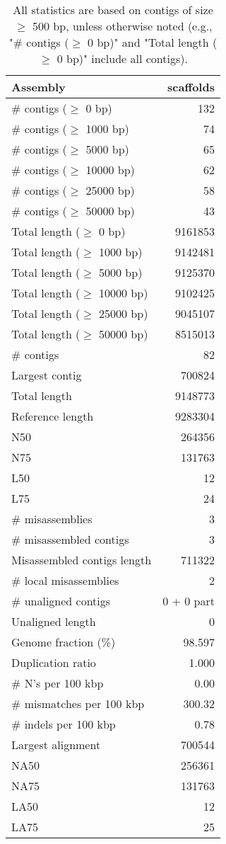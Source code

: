 \documentclass[12pt,a4paper]{article}
\begin{document}
\begin{table}[ht]
\begin{center}
\caption{All statistics are based on contigs of size $\geq$ 500 bp, unless otherwise noted (e.g., "\# contigs ($\geq$ 0 bp)" and "Total length ($\geq$ 0 bp)" include all contigs).}
\begin{tabular}{|l*{1}{|r}|}
\hline
Assembly & scaffolds \\ \hline
\# contigs ($\geq$ 0 bp) & 132 \\ \hline
\# contigs ($\geq$ 1000 bp) & 74 \\ \hline
\# contigs ($\geq$ 5000 bp) & 65 \\ \hline
\# contigs ($\geq$ 10000 bp) & 62 \\ \hline
\# contigs ($\geq$ 25000 bp) & 58 \\ \hline
\# contigs ($\geq$ 50000 bp) & 43 \\ \hline
Total length ($\geq$ 0 bp) & 9161853 \\ \hline
Total length ($\geq$ 1000 bp) & 9142481 \\ \hline
Total length ($\geq$ 5000 bp) & 9125370 \\ \hline
Total length ($\geq$ 10000 bp) & 9102425 \\ \hline
Total length ($\geq$ 25000 bp) & 9045107 \\ \hline
Total length ($\geq$ 50000 bp) & 8515013 \\ \hline
\# contigs & 82 \\ \hline
Largest contig & 700824 \\ \hline
Total length & 9148773 \\ \hline
Reference length & 9283304 \\ \hline
N50 & 264356 \\ \hline
N75 & 131763 \\ \hline
L50 & 12 \\ \hline
L75 & 24 \\ \hline
\# misassemblies & 3 \\ \hline
\# misassembled contigs & 3 \\ \hline
Misassembled contigs length & 711322 \\ \hline
\# local misassemblies & 2 \\ \hline
\# unaligned contigs & 0 + 0 part \\ \hline
Unaligned length & 0 \\ \hline
Genome fraction (\%) & 98.597 \\ \hline
Duplication ratio & 1.000 \\ \hline
\# N's per 100 kbp & 0.00 \\ \hline
\# mismatches per 100 kbp & 300.32 \\ \hline
\# indels per 100 kbp & 0.78 \\ \hline
Largest alignment & 700544 \\ \hline
NA50 & 256361 \\ \hline
NA75 & 131763 \\ \hline
LA50 & 12 \\ \hline
LA75 & 25 \\ \hline
\end{tabular}
\end{center}
\end{table}
\end{document}
